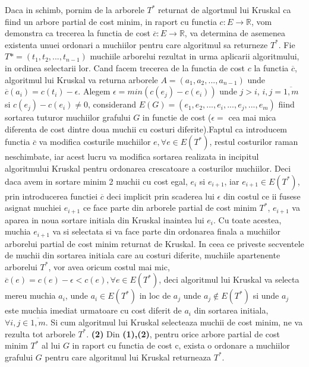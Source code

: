 \documentclass{article}
\begin{document}
Daca in schimb, pornim de la arborele $T^*$ returnat de algortmul lui Kruskal ca fiind un arbore partial de cost minim, in raport cu functia $c:E\rightarrow \mathbb{R}$, vom demonstra ca trecerea la functia de cost $\overline{c}:E\rightarrow \mathbb{R}$, va determina de asemenea existenta unuei ordonari a muchiilor pentru care algoritmul sa returneze $T^*$. Fie $T*=(t_1, t_2,..., t_{n-1})$ muchiile arborelui rezultat in urma aplicarii algoritmului, in ordinea selectarii lor. Cand facem trecerea de la functia de cost $c$ la functia $\overline{c}$, algoritmul lui Kruskal va returna arborele $A=(a_1, a_2,..., a_{n-1})$ unde $\overline{c}(a_i)=c(t_i)-\epsilon$. Alegem $\epsilon=min(c(e_j)-c(e_i))$ unde $j>i$, $i,j=\overline{1,m}$ si $c(e_j)-c(e_i) \not = 0$, considerand $E(G)=(e_1, e_2,..., e_i,..., e_j,..., e_m)$ fiind sortarea tuturor muchiilor grafului $G$ in functie de cost ($\epsilon=$ cea mai mica diferenta de cost dintre doua muchii cu costuri diferite).Faptul ca introducem functia $\overline{c}$ va modifica costurile muchiilor $e, \forall e \in E(T^*)$, restul costurilor raman neschimbate, iar acest lucru va modifica sortarea realizata in incipitul algoritmului Kruskal pentru ordonarea crescatoare a costurilor muchiilor. Deci daca avem in sortare minim 2 muchii cu cost egal, $e_i$ si $e_{i+1}$, iar $e_{i+1} \in E(T^*)$, prin introducerea functiei $\overline{c}$ deci implicit prin scaderea lui $\epsilon$ din costul ce ii fusese asignat muchiei $e_{i+1}$ ce face parte din arborele partial de cost minim $T^*$, $e_{i+1}$ va aparea in noua sortare initiala din Kruskal inaintea lui $e_i$. Cu toate acestea, muchia $e_{i+1}$ va si selectata si va face parte din ordonarea finala a muchiilor arborelui partial de cost minim returnat de Kruskal.
\newline
\newline
In ceea ce priveste secventele de muchii din sortarea initiala care au costuri diferite, muchiile apartenente arborelui $T^*$, vor avea oricum costul mai mic, $\overline{c}(e)=c(e)-\epsilon<c(e), \forall e \in E(T^*)$, deci algoritmul lui Kruskal va selecta mereu muchia $a_i$, unde $a_i \in E(T^*)$ in loc de $a_j$ unde $a_j \not \in E(T^*)$ si unde $a_j$ este muchia imediat urmatoare cu cost diferit de $a_i$ din sortarea initiala, $\forall i, j \in \overline{1,m}$. Si cum algoritmul lui Kruskal selecteaza muchii de cost minim, ne va rezulta tot arborele $T^*$. \textbf{(2)}
\newline
\newline
Din \textbf{(1),(2)}, pentru orice arbore partial de cost minim $T^*$ al lui $G$ in raport cu functia de cost c, exista o ordonare a muchiilor grafului $G$ pentru care algoritmul lui Kruskal returneaza $T^*$.
 
\end{document}
